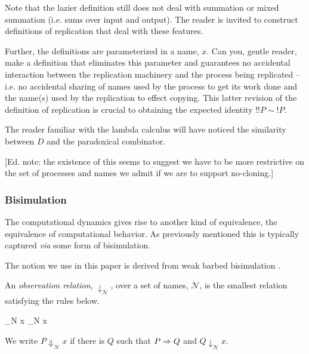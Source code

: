 \begin{remark}
  Note that the lazier definition still does not deal with summation
  or mixed summation (i.e. sums over input and output). The reader is
  invited to construct definitions of replication that deal with these
  features. 

  Further, the definitions are parameterized in a name, $x$. Can you,
  gentle reader, make a definition that eliminates this parameter and
  guarantees no accidental interaction between the replication
  machinery and the process being replicated -- i.e. no accidental
  sharing of names used by the process to get its work done and the
  name(s) used by the replication to effect copying. This latter
  revision of the definition of replication is crucial to obtaining
  the expected identity $!!P \sim !P$.
\end{remark}

\begin{remark}\label{rem:paradoxical_combinator}
  The reader familiar with the lambda calculus will have noticed the
  similarity between $D$ and the paradoxical combinator.

  [Ed. note: the existence of this seems to suggest we have to be more
  restrictive on the set of processes and names we admit if we are to
  support no-cloning.]
\end{remark}

\subsubsection{Bisimulation}

The computational dynamics gives rise to another kind of equivalence,
the equivalence of computational behavior. As previously mentioned
this is typically captured \emph{via} some form of bisimulation.


The notion we use in this paper is derived from weak barbed
bisimulation \cite{milner91polyadicpi}. 

\begin{definition}
An \emph{observation relation}, $\downarrow_{\mathcal N}$, over a set
of names, $\mathcal N$, is the smallest relation satisfying the rules
below.

		  { \downarrow_{\mathcal N} x}
		  { \downarrow_{\mathcal N} x}

We write $P \Downarrow_{\mathcal N} x$ if there is $Q$ such that 
$P \Rightarrow Q$ and $Q \downarrow_{\mathcal N} x$.
\end{definition}

